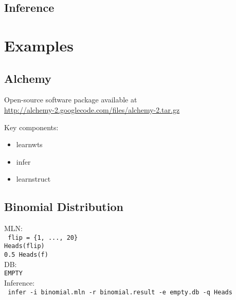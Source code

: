 \documentclass{beamer}
\begin{document}
\subsection{Inference}
\begin{frame}{\insertsubsection}
\end{frame}


\section{Examples}
\subsection{Alchemy}
\begin{frame}{\insertsubsection}
Open-source software package available at\\
{\small\url{http://alchemy-2.googlecode.com/files/alchemy-2.tar.gz}}\vspace{0.5cm}

Key components:
\begin{itemize}
  \item learnwts
  \item infer
  \item learnstruct
\end{itemize}
\end{frame}

\subsection{Binomial Distribution}
\begin{frame}{\insertsubsection}
MLN:\\
\texttt{\small
  flip = \{1, ..., 20\}\\
  Heads(flip)\\
  0.5 Heads(f)
}\\
\vspace{0.5cm}
DB:\\
\texttt{EMPTY}\\
\vspace{0.5cm}
Inference:\\
\texttt{
  \small
  infer -i binomial.mln -r binomial.result  -e empty.db -q Heads}
\end{frame}
\end{document}
